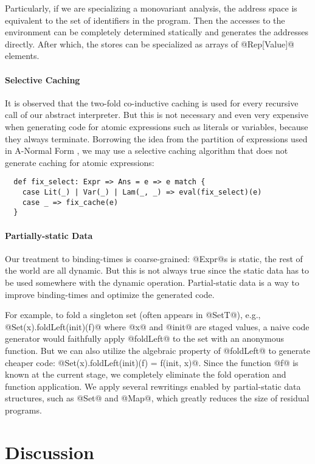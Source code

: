 Particularly, if we are specializing a monovariant analysis, the address space
is equivalent to the set of identifiers in the program. Then the accesses to the
environment can be completely determined statically and generates the addresses
directly. After which, the stores can be specialized as arrays of @Rep[Value]@
elements.

\paragraph{Selective Caching} It is observed that the two-fold co-inductive
caching is used for every recursive call of our abstract interpreter. But this
is not necessary and even very expensive when generating code for atomic
expressions such as literals or variables, because they always terminate.
Borrowing the idea from the partition of expressions used in A-Normal Form
\cite{Flanagan:1993:ECC:155090.155113}, we may use a selective caching
algorithm that does not generate caching for atomic expressions:
\begin{lstlisting}
  def fix_select: Expr => Ans = e => e match {
    case Lit(_) | Var(_) | Lam(_, _) => eval(fix_select)(e)
    case _ => fix_cache(e)
  }
\end{lstlisting}

\paragraph{Partially-static Data}

Our treatment to binding-times is coarse-grained: @Expr@s is static, the rest of
the world are all dynamic. But this is not always true since the static data
has to be used somewhere with the dynamic operation. Partial-static data is a
way to improve binding-times and optimize the generated code.

For example, to fold a singleton set (often appears in @SetT@), e.g.,
@Set(x).foldLeft(init)(f)@ where @x@ and @init@ are staged values, a naive code
generator would faithfully apply @foldLeft@ to the set with an anonymous
function. But we can also utilize the algebraic property of @foldLeft@ to
generate cheaper code: @Set(x).foldLeft(init)(f) = f(init, x)@. Since the
function @f@ is known at the current stage, we completely eliminate the fold
operation and function application. We apply several rewritings enabled by
partial-static data structures, such as @Set@ and @Map@, which greatly reduces
the size of residual programs.

\section{Discussion} \label{discussion}


